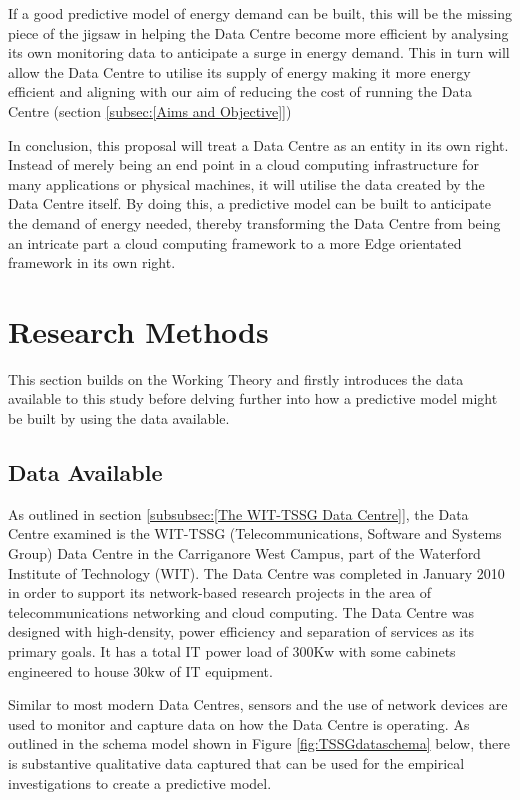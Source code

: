 \documentclass[12pt]{scrartcl}
\begin{document}
If a good predictive model of energy demand can be built, this will be the missing piece of the jigsaw in helping the Data Centre become more efficient by analysing its own monitoring data to anticipate a surge in energy demand. This in turn will allow the Data Centre to utilise its supply of energy making it more energy efficient and aligning with our aim of reducing the cost of running the Data Centre (section \ref{subsec:[Aims and Objective]})

In conclusion, this proposal will treat a Data Centre as an entity in its own right. Instead of merely being an end point in a cloud computing infrastructure for many applications or physical machines, it will utilise the data created by the Data Centre itself. By doing this, a predictive model can be built to anticipate the demand of energy needed, thereby transforming the Data Centre from being an intricate part a cloud computing framework to a more Edge orientated framework in its own right.    

\section{Research Methods}
\label{sec:[Research Methods]}
This section builds on the Working Theory and firstly introduces the data available to this study before delving further into how a predictive model might be built by using the data available.

\subsection{Data Available}
\label{subsec:[Data Available]}
As outlined in section \ref{subsubsec:[The WIT-TSSG Data Centre]}, the Data Centre examined is the WIT-TSSG (Telecommunications, Software and Systems Group) Data Centre in the Carriganore West Campus, part of the Waterford Institute of Technology (WIT). The Data Centre was completed in January 2010 in order to support its network-based research projects in the area of telecommunications networking and cloud computing. The Data Centre was designed with high-density, power efficiency and separation of services as its primary goals. It has a total IT power load of 300Kw with some cabinets engineered to house 30kw of IT equipment.

Similar to most modern Data Centres, sensors and the use of network devices are used to monitor and capture data on how the Data Centre is operating. As outlined in the schema model shown in Figure \ref{fig:TSSGdataschema} below, there is substantive qualitative data captured that can be used for the empirical investigations to create a predictive model.  
\end{document}
